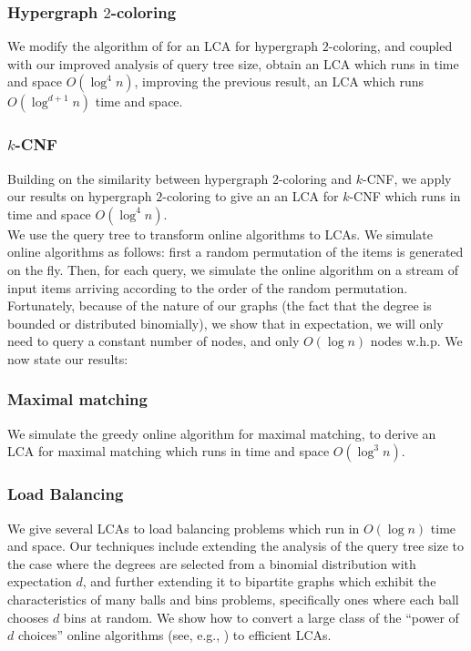 \documentclass[english, oribibl]{llncs}
\begin{document}
\subsubsection{Hypergraph $2$-coloring}
We modify the algorithm of \cite{ARV+11} for an LCA for hypergraph $2$-coloring, and coupled with our improved analysis of query tree size, obtain an LCA which runs in time and space $O(\log^4{n})$, improving the previous result, an LCA which runs $O(\log^{d+1} n)$  time and space. 

\subsubsection{$k$-CNF}
Building on the similarity between hypergraph $2$-coloring and $k$-CNF, we  apply our results on hypergraph $2$-coloring to give an an LCA for $k$-CNF which runs in time and space $O(\log^4{n})$.\\

We use the query tree to transform online algorithms to LCAs. We simulate online algorithms as follows: first a random permutation
of the items is generated on the fly. Then, for each query, we simulate the online algorithm on a stream of input items arriving according to
the order of the random permutation. Fortunately, because of the nature of our graphs (the fact that the degree is bounded or distributed binomially), we show that in expectation, we will only need to query a constant number of nodes, and only $O(\log{n})$ nodes w.h.p. We now state our results:

\subsubsection{Maximal matching}
We simulate the greedy online algorithm for maximal matching, to derive an LCA for maximal matching which runs in time and space $O(\log^3{n})$.

\subsubsection{Load Balancing}
 We give several LCAs to load balancing problems which run in $O(\log{n})$ time and space. Our techniques include extending 
 the analysis of the query tree size to  the case where the degrees are
selected from a binomial distribution with expectation $d$, and further extending it to bipartite graphs which exhibit 
the characteristics of many balls and bins problems, specifically ones where each ball chooses $d$ bins at random. We show how to convert a large class of the ``power of $d$ choices'' 
online algorithms (see, e.g., \cite{ABK+99, BCS+06, TW07}) to efficient
LCAs.
\end{document}
